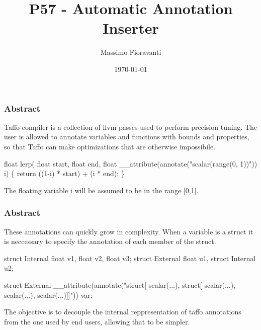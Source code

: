 \documentclass{beamer}
\title{P57 - Automatic Annotation Inserter}
\author{Massimo Fioravanti}
\institute{Polimi}
\date{\today}
\begin{document}
\begin{frame}
	\titlepage
\end{frame}

\begin{frame}[fragile]
	\frametitle{Abstract}
	\begin{block}{}
		Taffo compiler is a collection of llvm passes used to perform precision tuning.
		The user is allowed to annotate variables and functions with bounds and properties, so that Taffo can make optimizations that are otherwise impossibile.
	\end{block}

	\begin{alertblock}{}
	\begin{semiverbatim}
		float lerp(
		\quad float start, 
		\quad float end, 
		\quad float __attribute(annotate("scalar(range(0, 1))")) i)
		\{
		\quad return ((1-i) * start) + (i * end);
		\}
	\end{semiverbatim}
	\end{alertblock}

	\begin{block}{}
		The floating variable i will be assumed to be in the range [0,1].
	\end{block}
\end{frame}

\begin{frame}[fragile]
	\frametitle{Abstract}
	\begin{block}{}
		These annotations can quickly grow in complexity. 
		When a variable is a struct it is neccessary to specify the annotation of each member of the struct.
	\end{block}
	
	\begin{alertblock}{}
	\begin{semiverbatim}	
		struct Internal {float v1, float v2, float v3};
		struct External {float u1, struct Internal u2};
		
		struct External __attribute(annotate("struct[
		\quad scalar(...), struct[
		\quad \quad scalar(...), 
		\quad \quad scalar(...), 
		\quad \quad scalar(...)]]")) var;
	\end{semiverbatim}
	\end{alertblock}
	\begin{block}{}
		The objective is to decouple the internal reppresentation of taffo annotations from the one used by end users, allowing that to be simpler.
	\end{block}
\end{frame}
\end{document}
